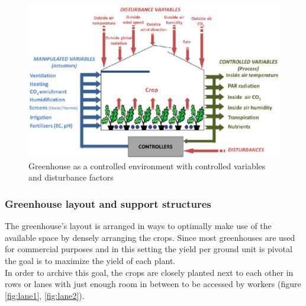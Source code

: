 \begin{figure}[H]
    \centering
    \includegraphics[width=1.0\textwidth]{user-view/climate-control-scheme.png}
    \caption{Greenhouse as a controlled environment with controlled variables and disturbance factors \cite{rod:greenhouse}}
    \label{fig:scheme:greenhouse}
\end{figure}

\subsubsection*{Greenhouse layout and support structures}

The greenhouse's layout is arranged in ways to optimally make use of the available space by densely
arranging the crops.
Since most greenhouses are used for commercial purposes and in this setting the yield per ground
unit is pivotal the goal is to maximize the yield of each plant.\\

In order to archive this goal, the crops are closely planted next to each other in rows
or lanes with just enough room in between to be accessed by workers (figure \ref{fig:lane1}, \ref{fig:lane2}).

